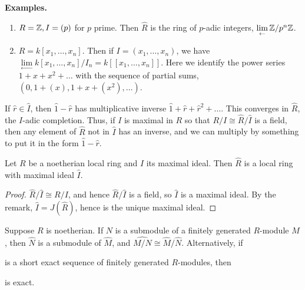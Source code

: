 \documentclass[10pt,a4paper]{article}
\begin{document}
\textbf{Examples.}
\begin{enumerate}
  \item $R = \mathbb{Z}, I=(p)$ for $p$ prime. Then $\hat{R}$ is the ring of $p$-adic integers, $\lim\limits_\leftarrow \mathbb{Z}/p^n\mathbb{Z}$.
  \item $R = k[x_1, \ldots, x_n]$. Then if $I = (x_1, \ldots, x_n)$, we have $\lim\limits_\leftarrow k[x_1, \ldots, x_n]/I_n = k[[x_1, \ldots, x_n]]$. Here we identify the power series $1+x+x^2+\ldots$ with the sequence of partial sums, $(0, 1+(x), 1+x+(x^2), \ldots)$.
\end{enumerate}
If $\hat{r} \in \hat{I}$, then $\hat{1}-\hat{r}$ has multiplicative inverse $\hat{1}+\hat{r}+\hat{r}^2+\ldots$. This converges in $\hat{R}$, the $I$-adic completion. Thus, if $I$ is maximal in $R$ so that $R/I \cong \hat{R}/\hat{I}$ is a field, then any element of $\hat{R}$ not in $\hat{I}$ has an inverse, and we can multiply by something to put it in the form $\hat{1}-\hat{r}$.
\begin{proposition}
  Let $R$ be a noetherian local ring and $I$ its maximal ideal. Then $\hat{R}$ is a local ring with maximal ideal $\hat{I}$.
\end{proposition}
\begin{proof}
  $\hat{R}/\hat{I} \cong R/I$, and hence $\hat{R}/\hat{I}$ is a field, so $\hat{I}$ is a maximal ideal. By the remark, $\hat{I} = J(\hat{R})$, hence is the unique maximal ideal.
\end{proof}
\begin{proposition}
  Suppose $R$ is noetherian. If $N$ is a submodule of a finitely generated $R$-module $M$, then $\hat{N}$ is a submodule of $\hat{M}$, and $\hat{M/N} \cong \hat{M}/\hat{N}$. Alternatively, if
  \begin{center}
  \end{center}
  is a short exact sequence of finitely generated $R$-modules, then
  \begin{center}
  \end{center}
  is exact.
\end{proposition}
\end{document}
